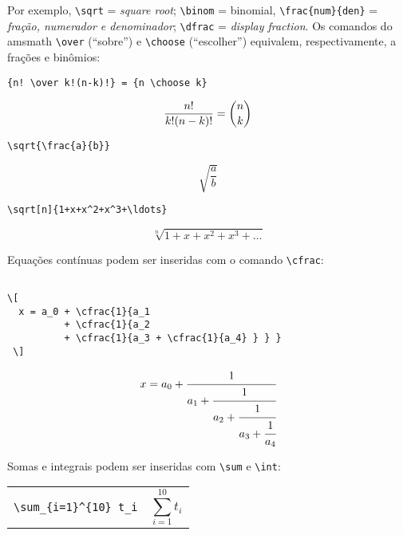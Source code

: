 \documentclass{scrartcl}
\begin{document}
Por exemplo, \verb+\sqrt+\index{\verb+\sqrt+} = \textit{square root}; \verb+\binom+ \index{ \verb+\binom+}= binomial, \verb+\frac{num}{den}+ = \textit{fração, numerador e denominador}; \verb+\dfrac+ = \textit{display fraction}. Os comandos do \textsf{amsmath} \verb+\over+ (``sobre'') e \verb+\choose+ (``escolher'') equivalem, respectivamente, a frações e binômios:



\begin{verbatim}
{n! \over k!(n-k)!} = {n \choose k}
\end{verbatim}

\begin{displaymath}
{n! \over k!(n-k)!} = {n \choose k}
\end{displaymath}

\begin{verbatim}
\sqrt{\frac{a}{b}}
\end{verbatim}

\begin{displaymath}
\sqrt{\frac{a}{b}}
\end{displaymath}

\begin{verbatim}
\sqrt[n]{1+x+x^2+x^3+\ldots}
\end{verbatim}

\[ \sqrt[n]{1+x+x^2+x^3+\ldots} \]

Equações contínuas podem ser inseridas com o comando \verb+\cfrac+:\index{\verb+\cfrac+}

\begin{verbatim}

\[ 
  x = a_0 + \cfrac{1}{a_1
          + \cfrac{1}{a_2
          + \cfrac{1}{a_3 + \cfrac{1}{a_4} } } }
 \]

\end{verbatim}

\[ 
  x = a_0 + \cfrac{1}{a_1
          + \cfrac{1}{a_2
          + \cfrac{1}{a_3 + \cfrac{1}{a_4} } } }
 \]

\bigskip


Somas e integrais  podem ser inseridas com \verb+\sum+ \index{\verb+\sum+} e \verb+\int+:\index{\verb+\int+}

\begin{tabular}{cc}
\begin{minipage}{0.4\textwidth}
\verb+\sum_{i=1}^{10} t_i+
\end{minipage} & \begin{minipage}{0.4\textwidth}\[ \sum_{i=1}^{10} t_i \] \end{minipage}
\end{tabular}
\end{document}
